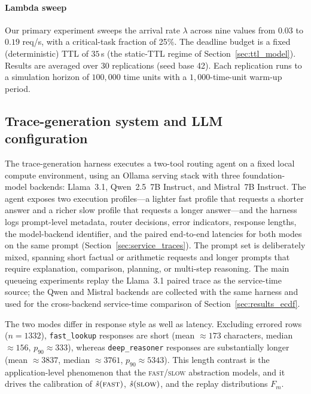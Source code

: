 \documentclass[fleqn,12pt,lineno]{wlpeerj}
\begin{document}
\paragraph{Lambda sweep}
Our primary experiment sweeps the arrival rate $\lambda$ across nine values from $0.03$ to $0.19$ req/s, with a critical-task fraction of 25\%. The deadline budget is a fixed (deterministic) TTL of $35$\,s (the static-TTL regime of Section~\ref{sec:ttl_model}). Results are averaged over 30 replications (seed base 42). Each replication runs to a simulation horizon of $100{,}000$ time units with a $1{,}000$-time-unit warm-up period.

\subsection{Trace-generation system and LLM configuration}
\label{sec:trace_system}

The trace-generation harness executes a two-tool routing agent on a fixed local compute environment, using an Ollama serving stack with three foundation-model backends: Llama~3.1, Qwen~2.5~7B Instruct, and Mistral~7B Instruct. The agent exposes two execution profiles---a lighter fast profile that requests a shorter answer and a richer slow profile that requests a longer answer---and the harness logs prompt-level metadata, router decisions, error indicators, response lengths, the model-backend identifier, and the paired end-to-end latencies for both modes on the same prompt (Section~\ref{sec:service_traces}). The prompt set is deliberately mixed, spanning short factual or arithmetic requests and longer prompts that require explanation, comparison, planning, or multi-step reasoning. The main queueing experiments replay the Llama~3.1 paired trace as the service-time source; the Qwen and Mistral backends are collected with the same harness and used for the cross-backend service-time comparison of Section~\ref{sec:results_ecdf}.

The two modes differ in response style as well as latency. Excluding errored rows ($n=1332$), \texttt{fast\_lookup} responses are short (mean $\approx 173$ characters, median $\approx 156$, $p_{90}\approx 333$), whereas \texttt{deep\_reasoner} responses are substantially longer (mean $\approx 3837$, median $\approx 3761$, $p_{90}\approx 5343$). This length contrast is the application-level phenomenon that the \textsc{fast}/\textsc{slow} abstraction models, and it drives the calibration of $\hat{s}(\textsc{fast})$, $\hat{s}(\textsc{slow})$, and the replay distributions $F_m$.
\end{document}
